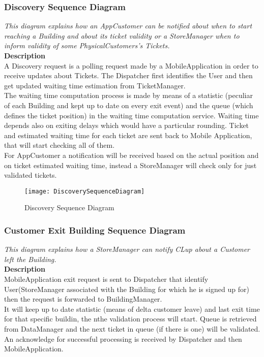 \subsubsection{Discovery Sequence Diagram}
\textit{This diagram explains how an AppCustomer can be notified about when to start reaching a Building and about its ticket validity or a StoreManager when to inform validity of some PhysicalCustomers’s Tickets.\\}
\textbf{Description\\}
A Discovery request is a polling request made by a MobileApplication in order to receive updates about Tickets. The Dispatcher first identifies the User and then get updated waiting time estimation from TicketManager.\\
The waiting time computation process is made by means of a statistic (peculiar of each Building and kept up to date on every exit event) and the queue (which defines the ticket position) in the waiting time computation service. Waiting time depends also on exiting delays which would have a particular rounding.
Ticket and estimated waiting time for each ticket are sent back to Mobile Application, that will start checking all of them.\\
For AppCustomer a notification will be received based on the actual position and on ticket estimated waiting time, instead a StoreManager will check only for just validated tickets.
\\

\begin{figure}[H]
 \centering
 \texttt{[image: DiscoverySequenceDiagram]}
 \caption{ Discovery Sequence Diagram }
 \end{figure}

\newpage
\subsubsection{Customer Exit Building Sequence Diagram}
\textit{This diagram explains how a StoreManager can notify CLup about a Customer left the Building.\\}
\textbf{Description\\}
MobileApplication exit request is sent to Dispatcher that identify User(StoreManager associated with the Building for which he is signed up for) then the request is forwarded to BuildingManager.\\
It will keep up to date statistic (means of delta customer leave) and last exit time for that specific buildin, the nthe validation process will start. Queue is retrieved from DataManager and the next ticket in queue (if there is one) will be validated. An acknowledge for successful processing is received by Dispatcher and then MobileApplication.\\

